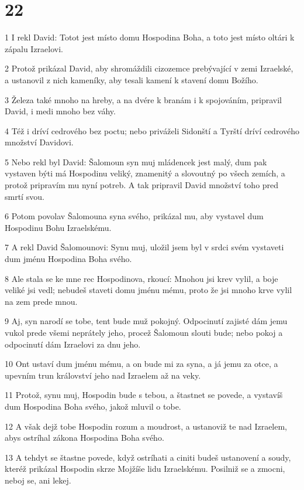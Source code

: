 \chapter{22}

\par 1 I rekl David: Totot jest místo domu Hospodina Boha, a toto jest místo oltári k zápalu Izraelovi.
\par 2 Protož prikázal David, aby shromáždili cizozemce prebývající v zemi Izraelské, a ustanovil z nich kameníky, aby tesali kamení k stavení domu Božího.
\par 3 Železa také mnoho na hreby, a na dvére k branám i k spojováním, pripravil David, i medi mnoho bez váhy.
\par 4 Též i dríví cedrového bez poctu; nebo priváželi Sidonští a Tyrští dríví cedrového množství Davidovi.
\par 5 Nebo rekl byl David: Šalomoun syn muj mládencek jest malý, dum pak vystaven býti má Hospodinu veliký, znamenitý a slovoutný po všech zemích, a protož pripravím mu nyní potreb. A tak pripravil David množství toho pred smrtí svou.
\par 6 Potom povolav Šalomouna syna svého, prikázal mu, aby vystavel dum Hospodinu Bohu Izraelskému.
\par 7 A rekl David Šalomounovi: Synu muj, uložil jsem byl v srdci svém vystaveti dum jménu Hospodina Boha svého.
\par 8 Ale stala se ke mne rec Hospodinova, rkoucí: Mnohou jsi krev vylil, a boje veliké jsi vedl; nebudeš staveti domu jménu mému, proto že jsi mnoho krve vylil na zem prede mnou.
\par 9 Aj, syn narodí se tobe, tent bude muž pokojný. Odpocinutí zajisté dám jemu vukol prede všemi neprátely jeho, procež Šalomoun slouti bude; nebo pokoj a odpocinutí dám Izraelovi za dnu jeho.
\par 10 Ont ustaví dum jménu mému, a on bude mi za syna, a já jemu za otce, a upevním trun království jeho nad Izraelem až na veky.
\par 11 Protož, synu muj, Hospodin bude s tebou, a štastnet se povede, a vystavíš dum Hospodina Boha svého, jakož mluvil o tobe.
\par 12 A však dejž tobe Hospodin rozum a moudrost, a ustanoviž te nad Izraelem, abys ostríhal zákona Hospodina Boha svého.
\par 13 A tehdyt se štastne povede, když ostríhati a ciniti budeš ustanovení a soudy, kteréž prikázal Hospodin skrze Mojžíše lidu Izraelskému. Posilniž se a zmocni, neboj se, ani lekej.
